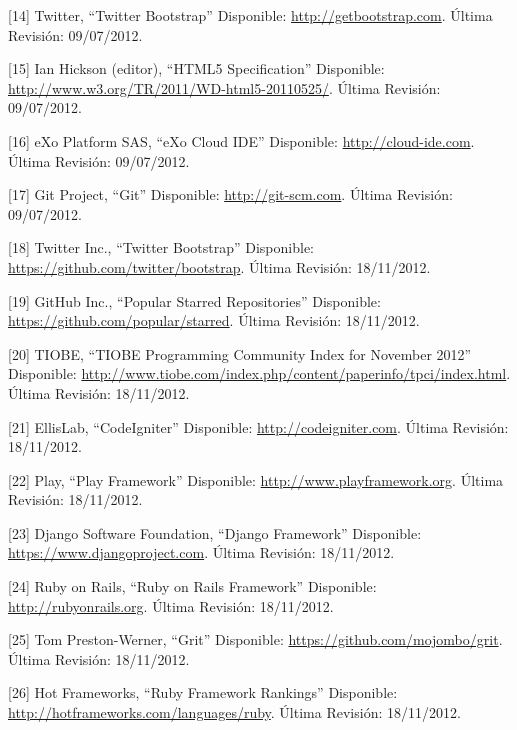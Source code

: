 \documentclass[12pt,spanish,letter]{report}
\begin{document}
{[}14{]} Twitter, ``Twitter Bootstrap'' Disponible:
\href{http://getbootstrap.com}{http://getbootstrap.com}. Última
Revisión: 09/07/2012.

{[}15{]} Ian Hickson (editor), ``HTML5 Specification'' Disponible:
\href{http://www.w3.org/TR/2011/WD-html5-20110525/}{http://www.w3.org/TR/2011/WD-html5-20110525/}.
Última Revisión: 09/07/2012.

{[}16{]} eXo Platform SAS, ``eXo Cloud IDE'' Disponible:
\href{http://cloud-ide.com}{http://cloud-ide.com}. Última Revisión:
09/07/2012.

{[}17{]} Git Project, ``Git'' Disponible:
\href{http://git-scm.com}{http://git-scm.com}. Última Revisión:
09/07/2012.

{[}18{]} Twitter Inc., ``Twitter Bootstrap'' Disponible:
\href{https://github.com/twitter/bootstrap}{https://github.com/twitter/bootstrap}.
Última Revisión: 18/11/2012.

{[}19{]} GitHub Inc., ``Popular Starred Repositories'' Disponible:
\href{https://github.com/popular/starred}{https://github.com/popular/starred}.
Última Revisión: 18/11/2012.

{[}20{]} TIOBE, ``TIOBE Programming Community Index for November 2012''
Disponible:
\href{http://www.tiobe.com/index.php/content/paperinfo/tpci/index.html}{http://www.tiobe.com/index.php/content/paperinfo/tpci/index.html}.
Última Revisión: 18/11/2012.

{[}21{]} EllisLab, ``CodeIgniter'' Disponible:
\href{http://codeigniter.com}{http://codeigniter.com}. Última Revisión:
18/11/2012.

{[}22{]} Play, ``Play Framework'' Disponible:
\href{http://www.playframework.org}{http://www.playframework.org}.
Última Revisión: 18/11/2012.

{[}23{]} Django Software Foundation, ``Django Framework'' Disponible:
\href{https://www.djangoproject.com}{https://www.djangoproject.com}.
Última Revisión: 18/11/2012.

{[}24{]} Ruby on Rails, ``Ruby on Rails Framework'' Disponible:
\href{http://rubyonrails.org}{http://rubyonrails.org}. Última Revisión:
18/11/2012.

{[}25{]} Tom Preston-Werner, ``Grit'' Disponible:
\href{https://github.com/mojombo/grit}{https://github.com/mojombo/grit}.
Última Revisión: 18/11/2012.

{[}26{]} Hot Frameworks, ``Ruby Framework Rankings'' Disponible:
\href{http://hotframeworks.com/languages/ruby}{http://hotframeworks.com/languages/ruby}.
Última Revisión: 18/11/2012.
\end{document}
